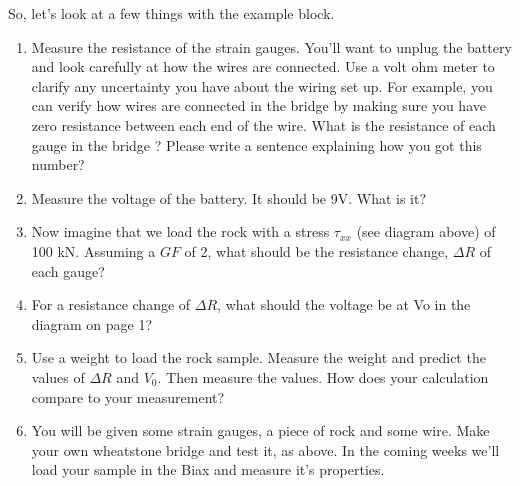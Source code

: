 \documentclass[10pt]{article}
\begin{document}
So, let’s look at a few things with the example block.  
\begin{enumerate}
	\item Measure the resistance of the strain gauges.  You’ll want to unplug the battery and look carefully at how the wires are connected.  Use a volt ohm meter to clarify any uncertainty you have about the wiring set up.  For example, you can verify how wires are connected in the bridge by making sure you have zero resistance between each end of the wire.  What is the resistance of each gauge in the bridge ?  Please write a sentence explaining how you got this number?
	\item Measure the voltage of the battery. It should be 9V. What is it?
	\item Now imagine that we load the rock with a stress $ \tau_{xx} $ (see diagram above) of 100 kN.  Assuming a $ GF $ of 2, what should be the resistance change, $ \Delta R $ of each gauge? 
	\item For a resistance change of $ \Delta R $, what should the voltage be at Vo in the diagram on page 1?
	\item Use a weight to load the rock sample. Measure the weight and predict the values of $ \Delta R $ and $ V_0 $. Then measure the values. How does your calculation compare to your measurement? 
	\item You will be given some strain gauges, a piece of rock and some wire. Make your own wheatstone bridge and test it, as above. In the coming weeks we’ll load your sample in the Biax and measure it’s properties.
\end{enumerate}
\end{document}
